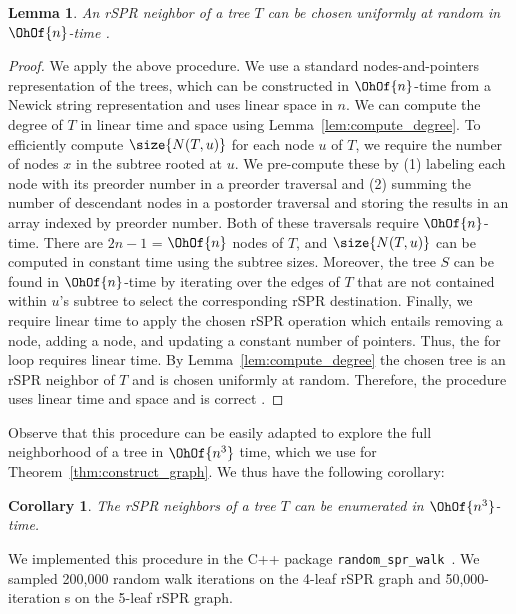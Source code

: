 \documentclass[11pt,onecolumn,conference]{IEEEtran}
\newtheorem{lemma}[theorem]{Lemma}
\newtheorem{corollary}[theorem]{Corollary}
\newcommand{\cuttable}[2][]{%
    \ifthenelse{\equal{#1}{}}%
		{}%
		{#1}%
}
\begin{document}
\begin{lemma}
	\label{lem:select_random_neighbor}
	An rSPR neighbor of a tree $T$ can be chosen uniformly at random in $\OhOf{n}$-time\cuttable{ using $\OhOf{n}$ space}.
\end{lemma}
\begin{proof}
	We apply the above procedure.
	We use a standard nodes-and-pointers representation of the trees, which can be constructed in $\OhOf{n}$-time from a Newick string representation and uses linear space in $n$.
	We can compute the degree of $T$ in linear time and space using Lemma~\ref{lem:compute_degree}.
	To efficiently compute $\size{N(T,u)}$ for each node $u$ of $T$, we require the number of nodes $x$ in the subtree rooted at $u$.
	We pre-compute these by (1) labeling each node with its preorder number in a preorder traversal and (2) summing the number of descendant nodes in a postorder traversal and storing the results in an array indexed by preorder number.
	Both of these traversals require $\OhOf{n}$-time.
	There are $2n-1$ = $\OhOf{n}$ nodes of $T$, and $\size{N(T,u)}$ can be computed in constant time using the subtree sizes.
	Moreover, the tree $S$ can be found in $\OhOf{n}$-time by iterating over the edges of $T$ that are not contained within $u$'s subtree to select the corresponding rSPR destination.
	Finally, we require linear time to apply the chosen rSPR operation which entails removing a node, adding a node, and updating a constant number of pointers.
	Thus, the for loop requires linear time.
	By Lemma~\ref{lem:compute_degree} the chosen tree is an rSPR neighbor of $T$ and is chosen uniformly at random.
	Therefore, the procedure uses linear time and space and \cuttable[is correct]{selects an rSPR neighbor of $T$ uniformly at random}.
\end{proof}

Observe that this procedure can be easily adapted to explore the full neighborhood of a tree in $\OhOf{n^3}$ time, which we use for Theorem~\ref{thm:construct_graph}.
We thus have the following corollary:

\begin{corollary}
	The rSPR neighbors of a tree $T$ can be enumerated in $\OhOf{n^3}$-time.
\end{corollary}

We implemented this procedure in the C++ package \texttt{random\_spr\_walk}~\cite{random_spr_walk}.
We sampled \cuttable{a }200,000\cuttable{-iteration} random walk\cuttable[ iterations]{} on the 4-leaf rSPR graph and \cuttable{a }50,000-iteration\cuttable[s]{ random walk} on the 5-leaf rSPR graph.
\end{document}
